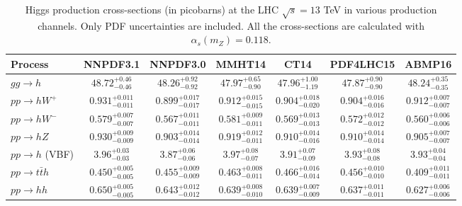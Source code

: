\begin{table}[t]
  \begin{center}
    \scriptsize
          \renewcommand{\arraystretch}{2.0}
\begin{tabular}{lcccccc}
  Process  & NNPDF3.1 & NNPDF3.0 & MMHT14 & CT14 & PDF4LHC15 & ABMP16\\
  \hline
  \hline
$gg \rightarrow h$  & $ 48.72^{+0.46}_{-0.46}$ & $48.26 ^{+0.92}_{-0.92}$ & $47.97^{+0.65}_{-0.90}$ & $47.96^{+1.00}_{-1.19}$ & $47.87^{+0.90}_{- 0.90}$ & $48.24^{+0.35}_{-0.35}$ \\
$ pp \rightarrow h W^+$ & $0.931^{+0.011}_{-0.011}$ & $0.899 ^{+0.017}_{-0.017}$ & $0.912^{+0.015}_{-0.015}$ & $0.904^{+0.018}_{-0.020}$ & $0.904^{+0.016}_{-0.016}$ & $0.912^{+0.007}_{-0.007}$ \\
$pp \rightarrow h W^-$ & $0.579^{+0.007}_ {-0.007}$ & $0.567 ^{+0.011}_{-0.011}$ & $0.581^{+0.009}_{-0.011}$ & $0.569^{+0.013}_{-0.013}$ & $0.572^{+0.012}_{-0.012}$ & $0.560^{+0.006}_{-0.006}$ \\
$pp \rightarrow h Z$ & $0.930^{+0.009}_{-0.009}$ & $0.903 ^{+0.014}_{-0.014}$ & $0.919^{+0.012}_{-0.011}$ & $0.910^{+0.014}_{-0.016}$ & $0.910^{+0.014}_{-0.014}$ & $0.905^{+0.007}_{-0.007}$ \\
$pp \rightarrow h$ (VBF)  & $3.96^{+0.03}_{-0.03}$ & $3.87 ^{+0.06}_{-0.06}$ & $3.97^{+0.08}_{-0.07}$ & $3.91^{+0.07}_{-0.09}$ & $3.93^{+0.08}_{-0.08}$ & $3.93^{+0.04}_{-0.04}$ \\
$pp \rightarrow t\bar t h$ & $0.450^{+0.005}_{-0.005}$ & $0.455^{+0.009}_{-0.009}$ & $0.463^{+0.008}_{-0.011}$ & $0.466^{+0.016}_{-0.014}$ & $0.456^{+0.010}_{-0.010}$ & $0.409^{+0.011}_{-0.011}$ \\
$pp \rightarrow hh $ & $0.650^{+0.005}_{-0.005}$ & $0.643^{+0.012}_{-0.012}$ & $0.639^{+0.008}_{-0.010}$ & $ 0.639^{+0.007}_{-0.009} $ & $0.637^{+0.011}_{-0.011}$ & $0.627^{+0.006}_{-0.006}$  
\end{tabular}
\caption{\small Higgs production cross-sections (in picobarns) at the LHC
  $\sqrt{s}=13$ TeV in various production channels.
  Only PDF uncertainties are included.
  All the cross-sections are calculated with $\alpha_s(m_Z)=0.118$.
}
\label{tab:Higgs1}
\end{center}
\end{table}
